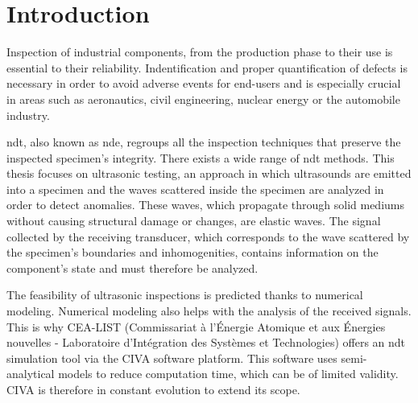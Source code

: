 \chapter*{Introduction}
Inspection of industrial components, from the production phase to their use is essential to their reliability. Indentification and proper quantification of defects is necessary in order to avoid adverse events for end-users and is especially crucial in areas such as aeronautics, civil engineering, nuclear energy or the automobile industry. 

\acrfull{ndt}, also known as \acrfull{nde}, regroups all the inspection techniques that preserve the inspected specimen's integrity. There exists a wide range of \acrshort{ndt} methods. This thesis focuses on ultrasonic testing, an approach in which ultrasounds are emitted into a specimen and the waves scattered inside the specimen are analyzed in order to detect anomalies. These waves, which propagate through solid mediums without causing structural damage or changes, are elastic waves. The signal collected by the receiving transducer, which corresponds to the wave scattered by the specimen's boundaries and inhomogenities, contains information on the component's state and must therefore be analyzed.

The feasibility of ultrasonic inspections is predicted thanks to numerical modeling. Numerical modeling also helps with the analysis of the received signals. This is why CEA-LIST (Commissariat à l’Énergie Atomique et aux Énergies nouvelles - Laboratoire d’Intégration des Systèmes et Technologies) offers an \acrshort{ndt} simulation tool via the CIVA software platform. This software uses semi-analytical models to reduce computation time, which can be of limited validity. CIVA is therefore in constant evolution to extend its scope.



